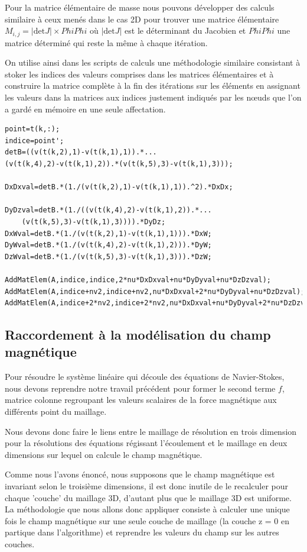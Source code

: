 \documentclass[a4paper,12pt,titlepage]{report}
\begin{document}
\begin{onehalfspace}
Pour la matrice élémentaire de masse nous pouvons développer des calculs similaire à ceux menés dans le cas 2D pour trouver une matrice élémentaire $M_{i, j} = |\text{det} J| \times PhiPhi$ où $|\text{det} J|$ est le déterminant du Jacobien et $PhiPhi$ une matrice déterminé qui reste la même à chaque itération.

On utilise ainsi dans les scripts de calculs une méthodologie similaire consistant à stoker les indices des valeurs comprises dans les matrices élémentaires et à construire la matrice complète à la fin des itérations sur les éléments en assignant les valeurs dans la matrices aux indices justement indiqués par les nœuds que l'on a gardé en mémoire en une seule affectation.

\begin{verbatim}
point=t(k,:);
indice=point';
detB=((v(t(k,2),1)-v(t(k,1),1)).*...
(v(t(k,4),2)-v(t(k,1),2)).*(v(t(k,5),3)-v(t(k,1),3)));
    
DxDxval=detB.*(1./(v(t(k,2),1)-v(t(k,1),1)).^2).*DxDx;
  
DyDzval=detB.*(1./((v(t(k,4),2)-v(t(k,1),2)).*...
    (v(t(k,5),3)-v(t(k,1),3)))).*DyDz;
DxWval=detB.*(1./(v(t(k,2),1)-v(t(k,1),1))).*DxW;
DyWval=detB.*(1./(v(t(k,4),2)-v(t(k,1),2))).*DyW;
DzWval=detB.*(1./(v(t(k,5),3)-v(t(k,1),3))).*DzW;
    
AddMatElem(A,indice,indice,2*nu*DxDxval+nu*DyDyval+nu*DzDzval);
AddMatElem(A,indice+nv2,indice+nv2,nu*DxDxval+2*nu*DyDyval+nu*DzDzval);
AddMatElem(A,indice+2*nv2,indice+2*nv2,nu*DxDxval+nu*DyDyval+2*nu*DzDzval);
\end{verbatim}
\subsection{Raccordement à la modélisation du champ magnétique}

Pour résoudre le système linéaire qui découle des équations de Navier-Stokes, nous devons reprendre notre travail précédent pour former le second terme $f$, matrice colonne regroupant les valeurs scalaires de la force magnétique aux différents point du maillage.

Nous devons donc faire le liens entre le maillage de résolution en trois dimension pour la résolutions des équations régissant l'écoulement et le maillage en deux dimensions sur lequel on calcule le champ magnétique. 

Comme nous l'avons énoncé, nous supposons que le champ magnétique est invariant selon le troisième dimensions, il est donc inutile de le recalculer pour chaque 'couche' du maillage 3D, d'autant plus que le maillage 3D est uniforme. 
La méthodologie que nous allons donc appliquer consiste à calculer une unique fois le champ magnétique sur une seule couche de maillage (la couche z = 0 en partique dans l'algorithme) et reprendre les valeurs du champ sur les autres couches.


\end{onehalfspace}
\end{document}
